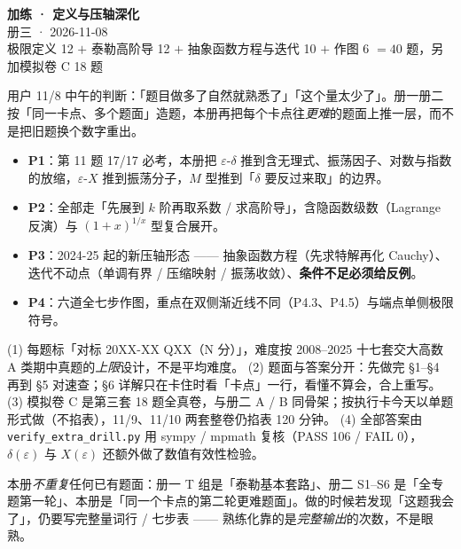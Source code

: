 \documentclass[11pt,a4paper]{ctexart}
\newcommand{\eps}{\varepsilon}
\begin{document}
\begin{center}
{\LARGE\bfseries 加练 · 定义与压轴深化}\\[0.4em]
{\large 册三 · 2026-11-08}\\[0.5em]
{\small 极限定义 12 $+$ 泰勒高阶导 12 $+$ 抽象函数方程与迭代 10 $+$ 作图 6 $= 40$ 题，另加模拟卷 C 18 题}
\end{center}

\begin{keypoint}[为什么又加一册]
用户 11/8 中午的判断：「题目做多了自然就熟悉了」「这个量太少了」。册一册二按「同一卡点、多个题面」造题，本册再把每个卡点往\emph{更难}的题面上推一层，而不是把旧题换个数字重出。
\begin{itemize}
\item \textbf{P1}：第 11 题 17/17 必考，本册把 $\eps$-$\delta$ 推到含无理式、振荡因子、对数与指数的放缩，$\eps$-$X$ 推到振荡分子，$M$ 型推到「$\delta$ 要反过来取」的边界。
\item \textbf{P2}：全部走「先展到 $k$ 阶再取系数 / 求高阶导」，含隐函数级数（Lagrange 反演）与 $(1+x)^{1/x}$ 型复合展开。
\item \textbf{P3}：2024-25 起的新压轴形态 —— 抽象函数方程（先求特解再化 Cauchy）、迭代不动点（单调有界 / 压缩映射 / 振荡收敛）、\textbf{条件不足必须给反例}。
\item \textbf{P4}：六道全七步作图，重点在双侧渐近线不同（P4.3、P4.5）与端点单侧极限符号。
\end{itemize}
\end{keypoint}

\begin{methodbox}
(1) 每题标「对标 20XX-XX QXX（N 分）」，难度按 2008--2025 十七套交大高数 A 类期中真题的\emph{上限}设计，不是平均难度。
(2) 题面与答案分开：先做完 \S1--\S4 再到 \S5 对速查；\S6 详解只在卡住时看「卡点」一行，看懂不算会，合上重写。
(3) 模拟卷 C 是第三套 18 题全真卷，与册二 A / B 同骨架；按执行卡今天以单题形式做（不掐表），11/9、11/10 两套整卷仍掐表 120 分钟。
(4) 全部答案由 \texttt{verify\_extra\_drill.py} 用 sympy / mpmath 复核（PASS 106 / FAIL 0），$\delta(\eps)$ 与 $X(\eps)$ 还额外做了数值有效性检验。
\end{methodbox}

\begin{warnbox}[与前两册的分工]
本册\emph{不重复}任何已有题面：册一 T 组是「泰勒基本套路」、册二 S1--S6 是「全专题第一轮」、本册是「同一个卡点的第二轮更难题面」。做的时候若发现「这题我会了」，仍要写完整量词行 / 七步表 —— 熟练化靠的是\emph{完整输出}的次数，不是眼熟。
\end{warnbox}
\end{document}
